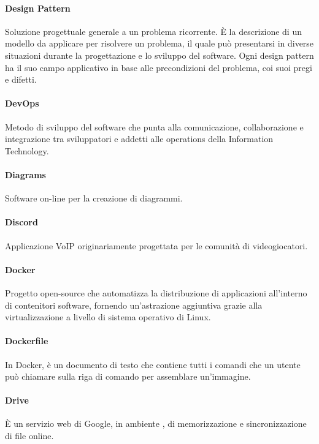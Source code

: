 \documentclass[]{article}
\begin{document}
	\paragraph*{Design Pattern}
	Soluzione progettuale generale a un problema ricorrente. È la descrizione di un modello da applicare per risolvere un problema, il quale può presentarsi in diverse situazioni durante la progettazione e lo sviluppo del software. Ogni design pattern ha il suo campo applicativo in base alle precondizioni del problema, coi suoi pregi e difetti.

	\paragraph*{DevOps}
	Metodo di sviluppo del software che punta alla comunicazione, collaborazione e integrazione tra sviluppatori e addetti alle operations della Information Technology.

	\paragraph*{Diagrams}
	Software on-line per la creazione di diagrammi.

	\paragraph*{Discord}
	Applicazione VoIP originariamente progettata per le comunità di videogiocatori.

	\paragraph*{Docker}
	Progetto open-source che automatizza la distribuzione di applicazioni all'interno di contenitori software, fornendo un'astrazione aggiuntiva grazie alla virtualizzazione a livello di sistema operativo di Linux.

	\paragraph*{Dockerfile}
	In Docker, è un documento di testo che contiene tutti i comandi che un utente può chiamare sulla riga di comando per assemblare un'immagine.

    \paragraph*{Drive}
    È un servizio web di Google, in ambiente , di memorizzazione e sincronizzazione di file online.
\end{document}
